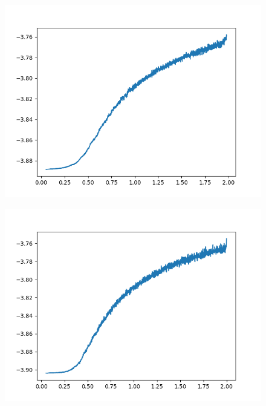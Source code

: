 \documentclass[12pt,reqno]{amsart}
\numberwithin{equation}{section}
\begin{document}
\begin{enumerate}
\begin{figure}[H]
\centering
\includegraphics[scale=0.6]{average_cooling_data_N2e6}
\end{figure}

\begin{figure}[H]
\centering
\includegraphics[scale=0.6]{average_cooling_data_N2e7}
\end{figure}


\end{enumerate}
\end{document}
